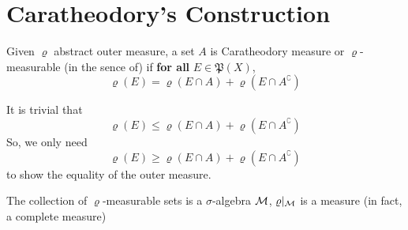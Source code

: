 \section{Caratheodory's Construction}

\begin{definition}
  Given $\varrho$ abstract outer measure,
  a set $A$ is Caratheodory measure or $\varrho$-measurable (in the sence of) 
  if \textbf{for all} $E \in \mathfrak{P}(X)$, 
  \[\varrho(E) = \varrho(E \cap A) + \varrho(E\cap A^\complement)\]
\end{definition}

\begin{remark}
  It is trivial that 
  \[\varrho(E) \le \varrho(E \cap A) + \varrho(E \cap A^\complement)\] 
  So, we only need 
  \[\varrho(E) \ge \varrho(E \cap A) + \varrho(E \cap A^\complement)\] 
  to show the equality of the outer measure.
\end{remark}

\begin{theorem}
  The collection of $\varrho$-measurable sets is a $\sigma$-algebra $\mathcal M$,
  $\varrho|_\mathcal M$
  is a measure (in fact, a complete measure)
\end{theorem}

